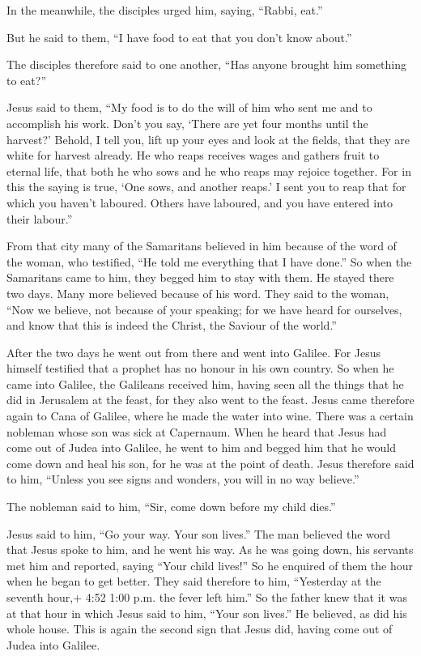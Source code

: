  In the meanwhile, the disciples urged him, saying,
``Rabbi, eat.''

 But he said to them, ``I have food to eat that you don't
know about.''

 The disciples therefore said to one another, ``Has anyone
brought him something to eat?''

 Jesus said to them, ``My food is to do the will of him who
sent me and to accomplish his work.  Don't you say, `There
are yet four months until the harvest?' Behold, I tell you, lift up your
eyes and look at the fields, that they are white for harvest already.
 He who reaps receives wages and gathers fruit to eternal
life, that both he who sows and he who reaps may rejoice together.
 For in this the saying is true, `One sows, and another
reaps.'  I sent you to reap that for which you haven't
laboured. Others have laboured, and you have entered into their
labour.''

 From that city many of the Samaritans believed in him
because of the word of the woman, who testified, ``He told me everything
that I have done.''  So when the Samaritans came to him,
they begged him to stay with them. He stayed there two days.
 Many more believed because of his word.  They
said to the woman, ``Now we believe, not because of your speaking; for
we have heard for ourselves, and know that this is indeed the Christ,
the Saviour of the world.''

 After the two days he went out from there and went into
Galilee.  For Jesus himself testified that a prophet has no
honour in his own country.  So when he came into Galilee,
the Galileans received him, having seen all the things that he did in
Jerusalem at the feast, for they also went to the feast. 
Jesus came therefore again to Cana of Galilee, where he made the water
into wine. There was a certain nobleman whose son was sick at Capernaum.
 When he heard that Jesus had come out of Judea into
Galilee, he went to him and begged him that he would come down and heal
his son, for he was at the point of death.  Jesus therefore
said to him, ``Unless you see signs and wonders, you will in no way
believe.''

 The nobleman said to him, ``Sir, come down before my child
dies.''

 Jesus said to him, ``Go your way. Your son lives.'' The
man believed the word that Jesus spoke to him, and he went his way.
 As he was going down, his servants met him and reported,
saying ``Your child lives!''  So he enquired of them the
hour when he began to get better. They said therefore to him,
``Yesterday at the seventh hour,+ 4:52 1:00 p.m. the fever left him.''
 So the father knew that it was at that hour in which Jesus
said to him, ``Your son lives.'' He believed, as did his whole house.
 This is again the second sign that Jesus did, having come
out of Judea into Galilee.

